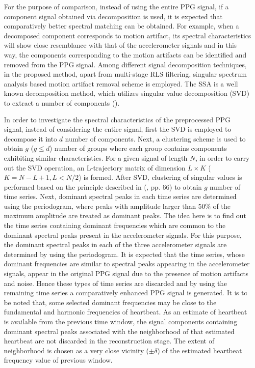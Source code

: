 \documentclass[final,3p,times,authoryear]{elsarticle}
\begin{document}
For the purpose of comparison, instead of using the entire PPG signal, if a component signal obtained via decomposition is used, it is expected that comparatively better spectral matching can be obtained. For example, when a decomposed component corresponds to motion artifact, its spectral characteristics will show close resemblance with that of the accelerometer signals and in this way, the components corresponding to the motion artifacts can be identified and removed from the PPG signal. Among different signal decomposition techniques, in the proposed method, apart from multi-stage RLS filtering, singular spectrum analysis based motion artifact removal scheme is employed. The SSA is a well known decomposition method, which utilizes singular value decomposition (SVD) to extract a number of components (\cite{bib:book2}). 


In order to investigate the spectral characteristics of the preprocessed PPG signal, instead of considering the entire signal, first the SVD is employed to decompose it into $d$ number of components. Next, a clustering scheme is used to obtain $g$ ($g \leq d $) number of groups where each group contains components exhibiting similar characteristics.  For a given signal of length $N$, in order to carry out the SVD operation, an L-trajectory matrix of dimension  $L\times K$ ($K = N - L + 1,L < N/2$) is formed. After SVD, clustering of singular values is performed based on the principle described in (\cite{bib:book2}, pp. 66) to obtain $g$ number of time series.
Next, dominant spectral peaks in each time series are determined using the periodogram, where peaks with amplitude larger than $50\%$ of the maximum amplitude are treated as dominant peaks. The idea here is to find out the time series containing dominant frequencies which are common to the dominant spectral peaks present in the accelerometer signals. For this purpose, the dominant spectral peaks in each of the three accelerometer signals are determined by using the periodogram. It is expected that the time series, whose dominant frequencies are similar to spectral peaks appearing in the accelerometer signals, appear in the original PPG signal due to the presence of motion artifacts and noise. Hence these types of time series are discarded and by using the remaining time series a comparatively enhanced PPG signal is generated. It is to be noted that, some selected dominant frequencies may be close to the fundamental and harmonic frequencies of heartbeat. As an estimate of heartbeat is available from the previous time window, the signal components containing dominant spectral peaks associated with the neighborhood of that estimated heartbeat are not discarded in the reconstruction stage. The extent of neighborhood is chosen as a very close vicinity ($\pm \delta$) of the estimated heartbeat frequency value of previous window.  
\end{document}
